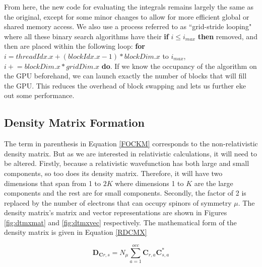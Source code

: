From here, the new code for evaluating the integrals remains largely the same as the original, except for some minor changes to allow for more efficient global or shared memory access. We also use a process referred to as ``grid-stride looping" where all these binary search algorithms have their \textbf{if} $i \le i_{max}$ \textbf{then} removed, and then are placed within the following loop: \textbf{for} $i = threadIdx.x + (blockIdx.x - 1) * blockDim.x$ to $i_{max}$, $i \mathrel{+}= blockDim.x * gridDim.x$ \textbf{do}. If we know the occupancy of the algorithm on the GPU beforehand, we can launch exactly the number of blocks that will fill the GPU. This reduces the overhead of block swapping and lets us further eke out some performance.

\subsection{Density Matrix Formation}
The term in parenthesis in Equation \ref{FOCKM} corresponds to the non-relativistic density matrix. But as we are interested in relativistic calculations, it will need to be altered. Firstly, because a relativistic wavefunction has both large and small components, so too does its density matrix. Therefore, it will have two dimensions that span from 1 to $2K$ where dimensions 1 to $K$ are the large components and the rest are for small components. Secondly, the factor of 2 is replaced by the number of electrons that can occupy spinors of symmetry $\mu$. The density matrix's matrix and vector representations are shown in Figures \ref{fig:dtmxmat} and \ref{fig:dtmxvec} respectively. The mathematical form of the density matrix is given in Equation \ref{RDCMX}\cite{MATSUOKA2001218}

\begin{equation}
\label{RDCMX}
\textbf{D$_{\textbf{C}r,s}$} =N_{\mu}\sum^{occ}_{a=1}\textbf{C}_{r,a}\textbf{C}^{*}_{s,a}
\end{equation}

